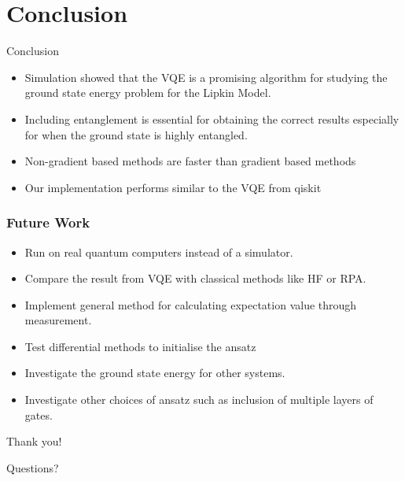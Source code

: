 \documentclass{beamer}
\begin{document}
\section{Conclusion}
\begin{frame}{Conclusion}
  \begin{itemize}
	\item Simulation showed that the VQE is a promising algorithm for studying the ground state energy problem for the Lipkin Model.
	\item Including entanglement is essential for obtaining the correct results especially for when the ground state is highly entangled. 
	\item Non-gradient based methods are faster than gradient based methods
	\item Our implementation performs similar to the VQE from qiskit
\end{itemize}
\end{frame}

\begin{frame}[t]
	\frametitle{Future Work}
	\begin{itemize}
		\item Run on real quantum computers instead of a simulator.
		\item Compare the result from VQE with classical methods like HF or RPA.
		\item Implement general method for calculating expectation value through measurement.
		\item Test differential methods to initialise the ansatz
		\item Investigate the ground state energy for other systems.
		\item Investigate other choices of ansatz such as inclusion of multiple layers of gates.

	\end{itemize}
\end{frame}
\begin{frame}{Thank you!}
  \begin{center}
    \LARGE Questions?
  \end{center}
\end{frame}
\end{document}
